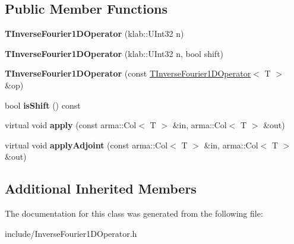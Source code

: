 \subsection*{Public Member Functions}
\begin{DoxyCompactItemize}
\item 
{\bfseries T\+Inverse\+Fourier1\+D\+Operator} (klab\+::\+U\+Int32 n)\hypertarget{classkl1p_1_1TInverseFourier1DOperator_a8eda1becaf73544501373c7b0a8f19bc}{}\label{classkl1p_1_1TInverseFourier1DOperator_a8eda1becaf73544501373c7b0a8f19bc}

\item 
{\bfseries T\+Inverse\+Fourier1\+D\+Operator} (klab\+::\+U\+Int32 n, bool shift)\hypertarget{classkl1p_1_1TInverseFourier1DOperator_abc24332387f8bc11f861457038d310ce}{}\label{classkl1p_1_1TInverseFourier1DOperator_abc24332387f8bc11f861457038d310ce}

\item 
{\bfseries T\+Inverse\+Fourier1\+D\+Operator} (const \hyperlink{classkl1p_1_1TInverseFourier1DOperator}{T\+Inverse\+Fourier1\+D\+Operator}$<$ T $>$ \&op)\hypertarget{classkl1p_1_1TInverseFourier1DOperator_a5c021cbe2c2e6bd3402400b2fa3641c4}{}\label{classkl1p_1_1TInverseFourier1DOperator_a5c021cbe2c2e6bd3402400b2fa3641c4}

\item 
bool {\bfseries is\+Shift} () const \hypertarget{classkl1p_1_1TInverseFourier1DOperator_a2b8e98045c1970d837dc7d875e134c59}{}\label{classkl1p_1_1TInverseFourier1DOperator_a2b8e98045c1970d837dc7d875e134c59}

\item 
virtual void {\bfseries apply} (const arma\+::\+Col$<$ T $>$ \&in, arma\+::\+Col$<$ T $>$ \&out)\hypertarget{classkl1p_1_1TInverseFourier1DOperator_a52a7a76d8e77c90ff9b57f5a4472e746}{}\label{classkl1p_1_1TInverseFourier1DOperator_a52a7a76d8e77c90ff9b57f5a4472e746}

\item 
virtual void {\bfseries apply\+Adjoint} (const arma\+::\+Col$<$ T $>$ \&in, arma\+::\+Col$<$ T $>$ \&out)\hypertarget{classkl1p_1_1TInverseFourier1DOperator_aea796462cfa5a9074d37df9c7b2217de}{}\label{classkl1p_1_1TInverseFourier1DOperator_aea796462cfa5a9074d37df9c7b2217de}

\end{DoxyCompactItemize}
\subsection*{Additional Inherited Members}


The documentation for this class was generated from the following file\+:\begin{DoxyCompactItemize}
\item 
include/Inverse\+Fourier1\+D\+Operator.\+h\end{DoxyCompactItemize}
